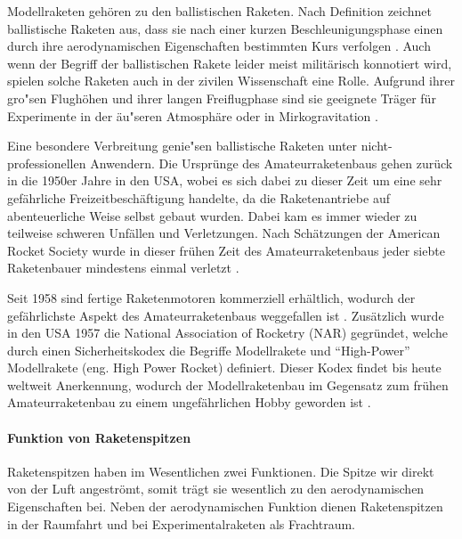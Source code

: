 \documentclass[10pt,a4paper]{article}
\begin{document}
\setcounter{page}{1}

Modellraketen gehören zu den ballistischen Raketen. 
Nach Definition zeichnet ballistische Raketen aus, dass sie nach einer kurzen Beschleunigungsphase einen durch ihre aerodynamischen Eigenschaften bestimmten Kurs verfolgen \cite{brock,hm}. 
Auch wenn der Begriff der ballistischen Rakete leider meist militärisch konnotiert wird, spielen solche Raketen auch in der zivilen Wissenschaft eine Rolle. Aufgrund ihrer gro"sen Flughöhen und ihrer langen Freiflugphase sind sie geeignete Träger für Experimente in der äu"seren Atmosphäre oder in Mirkogravitation \cite{dl}.

Eine besondere Verbreitung genie"sen ballistische Raketen unter nicht-professionellen Anwendern. Die Ursprünge des Amateurraketenbaus gehen zurück in die 1950er Jahre in den USA, wobei es sich dabei zu dieser Zeit um eine sehr gefährliche Freizeitbeschäftigung handelte, da die Raketenantriebe auf abenteuerliche Weise selbst gebaut wurden. Dabei kam es immer wieder zu teilweise schweren Unfällen und Verletzungen. Nach Schätzungen der American Rocket Society wurde in dieser frühen Zeit des Amateurraketenbaus jeder siebte Raketenbauer mindestens einmal verletzt \cite{om,sn}.

Seit 1958 sind fertige Raketenmotoren kommerziell erhältlich, wodurch der gefährlichste Aspekt des Amateurraketenbaus weggefallen ist \cite{sn}. Zusätzlich wurde in den USA 1957 die National Association of Rocketry (NAR) gegründet, welche durch einen Sicherheitskodex die Begriffe Modellrakete und "`High-Power"' Modellrakete (eng. High Power Rocket) definiert. Dieser Kodex findet bis heute weltweit Anerkennung, wodurch der Modellraketenbau im Gegensatz zum frühen Amateurraketenbau zu einem ungefährlichen Hobby geworden ist \cite{om}.

\paragraph{Funktion von Raketenspitzen}
Raketenspitzen haben im Wesentlichen zwei Funktionen. Die Spitze wir direkt von der Luft angeströmt, somit trägt sie wesentlich zu den aerodynamischen Eigenschaften bei. Neben der aerodynamischen Funktion dienen Raketenspitzen in der Raumfahrt und bei Experimentalraketen als Frachtraum.

\end{document}

